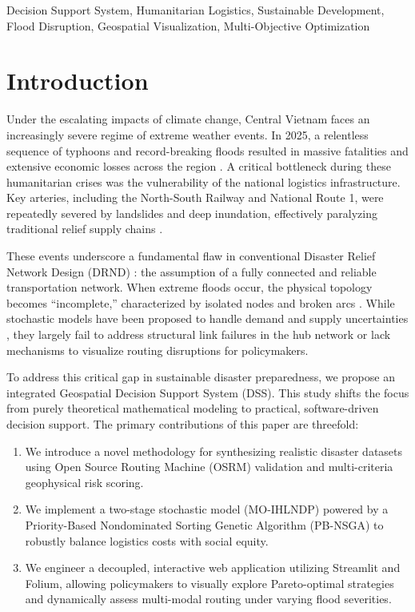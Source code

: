 \documentclass[conference]{IEEEtran}
\begin{document}
\begin{IEEEkeywords}
Decision Support System, Humanitarian Logistics, Sustainable Development, Flood Disruption, Geospatial Visualization, Multi-Objective Optimization
\end{IEEEkeywords}

\section{Introduction}
Under the escalating impacts of climate change, Central Vietnam faces an increasingly severe regime of extreme weather events. In 2025, a relentless sequence of typhoons and record-breaking floods resulted in massive fatalities and extensive economic losses across the region \cite{VOV2025}. A critical bottleneck during these humanitarian crises was the vulnerability of the national logistics infrastructure. Key arteries, including the North-South Railway and National Route 1, were repeatedly severed by landslides and deep inundation, effectively paralyzing traditional relief supply chains \cite{HanoiTimes2025}. 

These events underscore a fundamental flaw in conventional Disaster Relief Network Design (DRND) \cite{altay2006or}: the assumption of a fully connected and reliable transportation network. When extreme floods occur, the physical topology becomes ``incomplete,'' characterized by isolated nodes and broken arcs \cite{alumur2009incomplete}. While stochastic models have been proposed to handle demand and supply uncertainties \cite{tofighi2016humanitarian, Yahyaei2019}, they largely fail to address structural link failures in the hub network or lack mechanisms to visualize routing disruptions for policymakers.

To address this critical gap in sustainable disaster preparedness, we propose an integrated Geospatial Decision Support System (DSS). This study shifts the focus from purely theoretical mathematical modeling to practical, software-driven decision support. The primary contributions of this paper are threefold: 
\begin{enumerate}
    \item We introduce a novel methodology for synthesizing realistic disaster datasets using Open Source Routing Machine (OSRM) validation and multi-criteria geophysical risk scoring.
    \item We implement a two-stage stochastic model (MO-IHLNDP) powered by a Priority-Based Nondominated Sorting Genetic Algorithm (PB-NSGA) to robustly balance logistics costs with social equity.
    \item We engineer a decoupled, interactive web application utilizing Streamlit and Folium, allowing policymakers to visually explore Pareto-optimal strategies and dynamically assess multi-modal routing under varying flood severities.
\end{enumerate}
\end{document}
